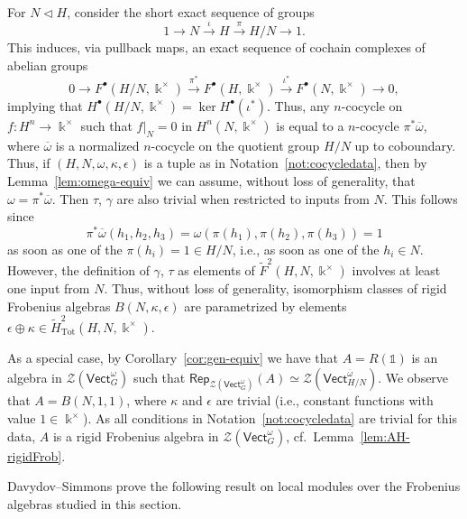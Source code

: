\documentclass[10pt,a4paper]{amsart}
\numberwithin{equation}{section}
\newcommand{\ov}[1]{\overline{#1}}
\newcommand{\wF}{\widetilde{F}}
\newcommand{\one}{\mathds{1}}
\newcommand{\Tot}{\mathrm{Tot}}
\newcommand{\Rep}{\mathsf{Rep}}
\newcommand{\Vect}{\mathsf{Vect}}
\newcommand{\cZ}{\mathcal{Z}}
\begin{document}
\begin{Remark}\label{rem:simplify}
For $N\triangleleft H$, consider the short exact sequence of groups
\[1\to N\xrightarrow{\iota}H\xrightarrow{\pi} H/N\to 1.\] This induces, via pullback maps, an exact sequence of cochain complexes of abelian groups
\[0\to F^\bullet(H/N,\Bbbk^\times)\xrightarrow{\pi^*} F^\bullet(H,\Bbbk^\times)\xrightarrow{\iota^*} F^\bullet(N,\Bbbk^\times)\to 0,\]
implying that
$H^\bullet(H/N,\Bbbk^\times)=\ker H^\bullet(\iota^*)$. Thus, any $n$-cocycle on $f\colon H^n\to \Bbbk^\times$ such that $ f|_N=0$ in $H^n(N,\Bbbk^\times)$ is equal to a $n$-cocycle $\pi^* \ov{\omega}$, where $\ov{\omega}$ is a normalized $n$-cocycle on the quotient group $H/N$ up to coboundary.
Thus, if $(H,N,\omega,\kappa, \epsilon)$ is a tuple as in Notation~\ref{not:cocycledata}, then by Lemma~\ref{lem:omega-equiv} we can assume, without loss of generality, that $\omega=\pi^*\ov{\omega}$. Then $\tau$, $\gamma$ are also trivial when restricted to inputs from $N$. This follows since
\[\pi^*\ov{\omega}(h_1,h_2,h_3)=\omega(\pi(h_1),\pi(h_2),\pi(h_3))=1\]
as soon as one of the $\pi(h_i)=1\in H/N$, i.e., as soon as one of the $h_i\in N$. However, the definition of $\gamma$, $\tau$ as elements of $\wF^2(H,N,\Bbbk^\times)$ involves at least one input from $N$.
Thus, without loss of generality, isomorphism classes of rigid Frobenius algebras $B(N,\kappa,\epsilon)$ are parametrized by elements $\epsilon\oplus \kappa\in \tilde{H}^2_{\Tot}(H,N,\Bbbk^\times)$.

As a special case, by Corollary~\ref{cor:gen-equiv} we have that $A=R(\one)$ is an algebra in $\cZ(\Vect_G^{\omega})$ such that $\Rep_{\cZ(\Vect_G^{\omega})}(A)\simeq \cZ(\Vect_{H/N}^{\ov{\omega}})$. We observe that
$A=B(N,1,1)$, where $\kappa$ and $\epsilon$ are trivial (i.e., constant functions with value $1\in \Bbbk^\times$). As all conditions in Notation~\ref{not:cocycledata} are trivial for this data, $A$ is a rigid Frobenius algebra in $\cZ(\Vect_G^{\omega})$, cf.\ Lemma~\ref{lem:AH-rigidFrob}.
\end{Remark}

Davydov--Simmons prove the following result on local modules over the Frobenius algebras studied in this section.
\end{document}
